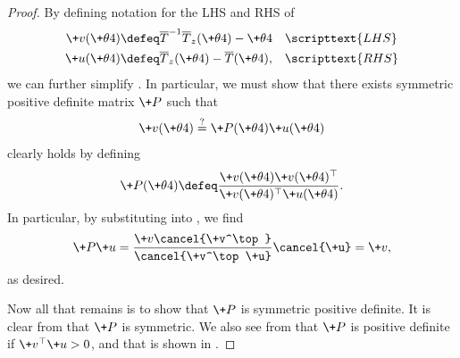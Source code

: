 \documentclass{article} %
\newcommand{\transformationMatrixGradientToEMStep}{\+P}
\begin{document}
\begin{proof}
By defining notation for the LHS and RHS of 
%
\begin{align}
\+v(\+\theta^^t)& \defeq \overline{T}^{-1} \overline{T}_z(\+\theta^^t) - \+\theta^^t && \scripttext{LHS} \\
\+u(\+\theta^^t)& \defeq \overline{T}_z(\+\theta^^t)  - 	\overline{T}(\+\theta^^t), && \scripttext{RHS}
\end{align}
%
we can further simplify .  In particular, we must show that there exists symmetric positive definite matrix $\transformationMatrixGradientToEMStep$ such that
%
\begin{align}
\+v(\+\theta^^t) \stackrel{?}{=} \transformationMatrixGradientToEMStep(\+\theta^^t)  \+u(\+\theta^^t)
\label{eqn:relating_the_EM_step_to_the_ordinary_gradient__VERY_compact_notation}
\end{align}
%
 clearly holds by defining
%
\begin{align}
\transformationMatrixGradientToEMStep(\+\theta^^t) \defeq  \frac{\+v(\+\theta^^t) \+v(\+\theta^^t)^\top}{\+v(\+\theta^^t)^\top \+u(\+\theta^^t)}.
\label{eqn:solution_to_transformation_matrix_relating_the_EM_step_to_the_ordinary_gradient__VERY_compact_notation} 
\end{align}
%
In particular, by substituting   into , we find 
%
\begin{align}
\transformationMatrixGradientToEMStep \+u =  \frac{\+v \cancel{\+v^\top}}{\cancel{\+v^\top \+u}} \cancel{\+u} = \+v,
\end{align}
%
as desired.  

Now all that remains is to show that $\transformationMatrixGradientToEMStep$ is symmetric positive definite.  It is clear from  that $\transformationMatrixGradientToEMStep$ is symmetric.  We also see from  that $\transformationMatrixGradientToEMStep$ is positive definite if $\+v^\top \+u >0$, and that is shown in \citet[Eqn.~26]{salakhutdinov2002relationship}.
\end{proof}
\end{document}

